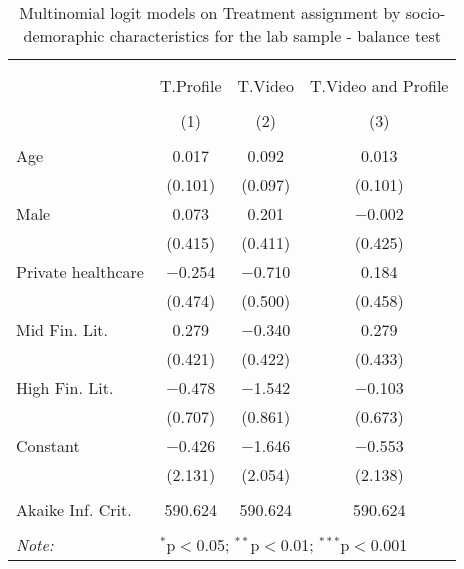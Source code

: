 
\begin{table}[H] \centering 
  \caption{Multinomial logit models on Treatment assignment by socio-demoraphic characteristics for the lab sample - balance test} 
  \label{tbl:balance_lab} 
\begin{tabular}{@{\extracolsep{5pt}}lccc} 
\\[-1.8ex]\hline 
\hline \\[-1.8ex] 
\\[-1.8ex] & T.Profile & T.Video & T.Video and Profile \\ 
\\[-1.8ex] & (1) & (2) & (3)\\ 
\hline \\[-1.8ex] 
 Age & 0.017 & 0.092 & 0.013 \\ 
  & (0.101) & (0.097) & (0.101) \\ 
  Male & 0.073 & 0.201 & $-$0.002 \\ 
  & (0.415) & (0.411) & (0.425) \\ 
  Private healthcare & $-$0.254 & $-$0.710 & 0.184 \\ 
  & (0.474) & (0.500) & (0.458) \\ 
  Mid Fin. Lit. & 0.279 & $-$0.340 & 0.279 \\ 
  & (0.421) & (0.422) & (0.433) \\ 
  High Fin. Lit. & $-$0.478 & $-$1.542 & $-$0.103 \\ 
  & (0.707) & (0.861) & (0.673) \\ 
  Constant & $-$0.426 & $-$1.646 & $-$0.553 \\ 
  & (2.131) & (2.054) & (2.138) \\ 
 \hline \\[-1.8ex] 
Akaike Inf. Crit. & 590.624 & 590.624 & 590.624 \\ 
\hline 
\hline \\[-1.8ex] 
\textit{Note:}  & \multicolumn{3}{l}{$^{*}$p$<$0.05; $^{**}$p$<$0.01; $^{***}$p$<$0.001} \\ 
\end{tabular} 
\end{table} 
